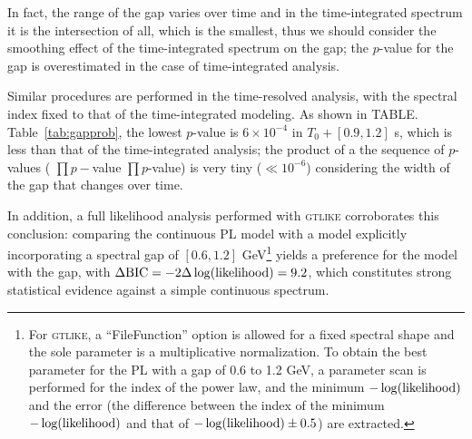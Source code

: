 \documentclass[linenumbers,twocolumn]{aastex631}
\providecommand{\DIFaddtex}[1]{{\protect\color{blue} \sf #1}} %
\providecommand{\DIFdeltex}[1]{{\protect\color{red} \scriptsize #1}} %
\providecommand{\DIFaddbegin}{} %
\providecommand{\DIFaddend}{} %
\providecommand{\DIFdelbegin}{} %
\providecommand{\DIFdelend}{} %
\providecommand{\DIFadd}[1]{\texorpdfstring{\DIFaddtex{#1}}{#1}} %
\providecommand{\DIFdel}[1]{\texorpdfstring{\DIFdeltex{#1}}{}} %
\begin{document}
In fact, the range of the gap varies over time and in the time-integrated spectrum it is the intersection of all, which is the smallest, thus we should consider the smoothing effect of the time-integrated spectrum on the gap; the $p$-value for the gap is overestimated in the case of time-integrated analysis. %

Similar procedures are performed in \DIFaddbegin \DIFadd{the }\DIFaddend time-resolved analysis, with the spectral index fixed to that of \DIFaddbegin \DIFadd{the }\DIFaddend time-integrated modeling. As shown in \DIFdelbegin \DIFdel{TABLE.}\DIFdelend \DIFaddbegin \DIFadd{Table}\DIFaddend ~\ref{tab:gapprob}, the lowest $p$-value is $6\times10^{-4}$ in $T_0+[0.9, 1.2]$ s, which is less than that of the time-integrated analysis; the product of \DIFdelbegin \DIFdel{a }\DIFdelend \DIFaddbegin \DIFadd{the }\DIFaddend sequence of $p$-values (\DIFdelbegin \DIFdel{$\prod p-$value}\DIFdelend \DIFaddbegin \DIFadd{$\prod p$-value}\DIFaddend ) is very tiny ($\ll10^{-6}$) considering the width of the gap that changes over time.

\DIFaddbegin \DIFadd{In addition, a full likelihood analysis performed with \textsc{gtlike} corroborates this conclusion: comparing the continuous PL model with a model explicitly incorporating a spectral gap of $[0.6, 1.2]$ GeV}\footnote{\DIFadd{For \textsc{gtlike}, a ``FileFunction'' option is allowed for a fixed spectral shape and the sole parameter is a multiplicative normalization. To obtain the best parameter for the PL with a gap of 0.6 to 1.2 GeV, a parameter scan is performed for the index of the power law, and the minimum $-\log(\rm likelihood)$ and the error (the difference between the index of the minimum $-\log(\rm likelihood)$ and that of $-\log(\rm likelihood)\pm0.5$) are extracted.}} \DIFadd{yields a preference for the model with the gap, with $\Delta \mathrm{BIC}=-2\Delta\log(\rm likelihood)=9.2$, which constitutes strong statistical evidence against a simple continuous spectrum.
}
\end{document}
